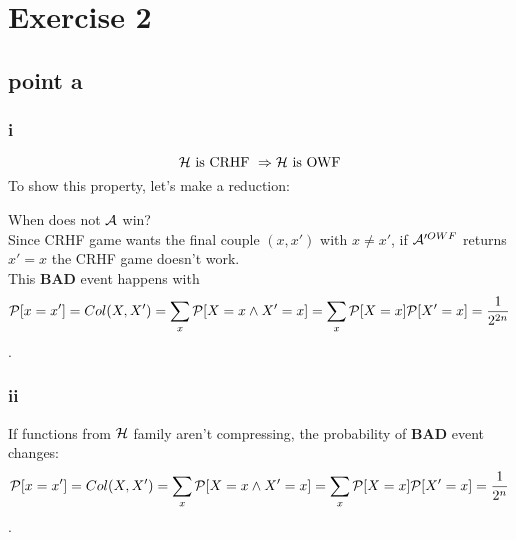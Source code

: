 \chapter*{Exercise 2}

\section{point a}
\subsection{ i}%

\[
    \H \text{ is CRHF } \Rightarrow \H \text{ is OWF}
\]
To show this property, let's make a reduction:

\begin{figure}[h!]
   \centering
   \sdinit{}
\end{figure}

When does not $\A$ win?\\
Since CRHF game  wants the final couple $(x, x')$ with $x\not= x'$, if
$\A'^{OWF}$ returns $x'=x$ the CRHF game doesn't work.\\

This \textbf{BAD} event happens with 
\[
    \P [ x=x' ]=Col(X, X')=\sum_{x}^{} \P [ X=x \wedge X'=x ]= \sum_{x}^{} \P [
    X=x] \P [ X'=x ] = \frac{1}{2^{2n}}        
\].
\subsection{ ii}%

If functions from $\H$ family aren't compressing, the probability of
\textbf{BAD} event changes:
\[
    \P [ x=x' ]=Col(X, X')=\sum_{x}^{} \P [ X=x \wedge X'=x ]= \sum_{x}^{} \P [
    X=x] \P [ X'=x ] = \frac{1}{2^{n}}        
\].

